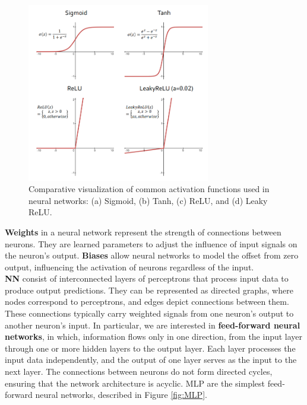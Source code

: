 \begin{figure}[ht]
    \centering
    \includegraphics[width=8cm]{images/Theory-DL/ActGraphs.png}
    \caption{Comparative visualization of common activation functions used in neural networks: (a) Sigmoid, (b) Tanh, (c) ReLU, and (d) Leaky ReLU.}
    \label{fig:ActGraphs}
  \end{figure}
\textbf{Weights} in a neural network represent the strength of connections between neurons. They are learned parameters to adjust the influence of input signals on the neuron's output. \textbf{Biases} allow neural networks to model the offset from zero output, influencing the activation of neurons regardless of the input.\\
\textbf{\gls{NN}} consist of interconnected layers of perceptrons that process input data to produce output predictions. They can be represented as directed graphs, where nodes correspond to perceptrons, and edges depict connections between them. These connections typically carry weighted signals from one neuron's output to another neuron's input. In particular, we are interested in \textbf{feed-forward neural networks}, in which, information flows only in one direction, from the input layer through one or more hidden layers to the output layer. Each layer processes the input data independently, and the output of one layer serves as the input to the next layer. The connections between neurons do not form directed cycles, ensuring that the network architecture is acyclic. \gls{MLP} are the simplest feed-forward neural networks, described in Figure \ref{fig:MLP}. 

